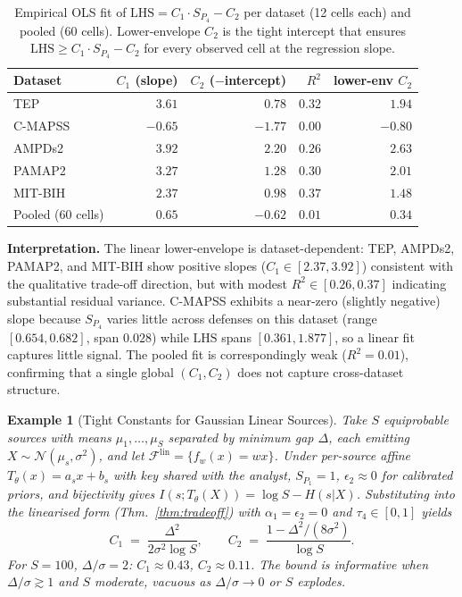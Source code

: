 \documentclass{article}
\newtheorem{example}{Example}
\theoremstyle{remark}
\begin{document}
\begin{table}[h]
\centering
\caption{Empirical OLS fit of $\mathrm{LHS} = C_1 \cdot S_{P_4} - C_2$ per dataset (12 cells each) and pooled (60 cells). Lower-envelope $C_2$ is the tight intercept that ensures $\mathrm{LHS} \ge C_1 \cdot S_{P_4} - C_2$ for every observed cell at the regression slope.}
\label{tab:c1c2_fits}
\small
\begin{tabular}{@{}lrrrr@{}}
\toprule
Dataset & $C_1$ (slope) & $C_2$ ($-$intercept) & $R^2$ & lower-env $C_2$ \\
\midrule
TEP        & $\phantom{-}3.61$ & $\phantom{-}0.78$ & $0.32$ & $\phantom{-}1.94$ \\
C-MAPSS    & $-0.65$           & $-1.77$           & $0.00$ & $-0.80$           \\
AMPDs2     & $\phantom{-}3.92$ & $\phantom{-}2.20$ & $0.26$ & $\phantom{-}2.63$ \\
PAMAP2     & $\phantom{-}3.27$ & $\phantom{-}1.28$ & $0.30$ & $\phantom{-}2.01$ \\
MIT-BIH    & $\phantom{-}2.37$ & $\phantom{-}0.98$ & $0.37$ & $\phantom{-}1.48$ \\
\midrule
Pooled (60 cells) & $\phantom{-}0.65$ & $-0.62$ & $0.01$ & $\phantom{-}0.34$ \\
\bottomrule
\end{tabular}
\end{table}

\textbf{Interpretation.} The linear lower-envelope is dataset-dependent: TEP, AMPDs2, PAMAP2, and MIT-BIH show positive slopes ($C_1 \in [2.37, 3.92]$) consistent with the qualitative trade-off direction, but with modest $R^2 \in [0.26, 0.37]$ indicating substantial residual variance. C-MAPSS exhibits a near-zero (slightly negative) slope because $S_{P_4}$ varies little across defenses on this dataset (range $[0.654, 0.682]$, span $0.028$) while $\mathrm{LHS}$ spans $[0.361, 1.877]$, so a linear fit captures little signal. The pooled fit is correspondingly weak ($R^2 = 0.01$), confirming that a single global $(C_1, C_2)$ does not capture cross-dataset structure.

\begin{example}[Tight Constants for Gaussian Linear Sources]
\label{ex:gaussian}
Take $S$ equiprobable sources with means $\mu_1, \ldots, \mu_S$ separated by minimum gap $\Delta$, each emitting $X \sim \mathcal{N}(\mu_s, \sigma^2)$, and let $\mathcal{F}^{\mathrm{lin}} = \{f_w(x) = wx\}$. Under per-source affine $T_\theta(x) = a_s x + b_s$ with key shared with the analyst, $S_{P_1} = 1$, $\epsilon_2 \approx 0$ for calibrated priors, and bijectivity gives $I(s; T_\theta(X)) = \log S - H(s|X)$. Substituting into the linearised form (Thm.~\ref{thm:tradeoff}) with $\alpha_1 = \epsilon_2 = 0$ and $\tau_4 \in [0,1]$ yields
\[
C_1 \;=\; \frac{\Delta^2}{2\sigma^2 \log S}, \qquad C_2 \;=\; \frac{1 - \Delta^2/(8\sigma^2)}{\log S}.
\]
For $S = 100$, $\Delta/\sigma = 2$: $C_1 \approx 0.43$, $C_2 \approx 0.11$. The bound is informative when $\Delta/\sigma \gtrsim 1$ and $S$ moderate, vacuous as $\Delta/\sigma \to 0$ or $S$ explodes.
\end{example}
\end{document}
